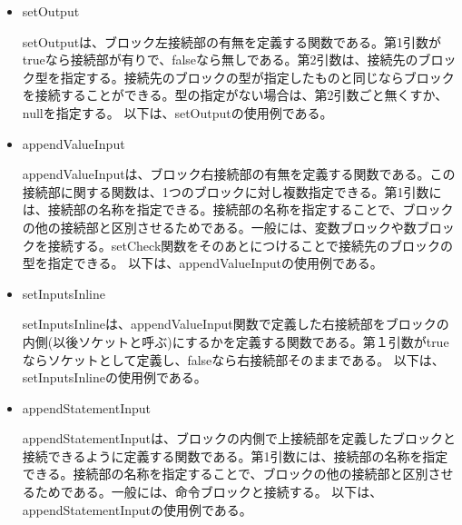 \documentclass{eniepaper}
\begin{document}
\begin{itemize}
\item setOutput

setOutputは、ブロック左接続部の有無を定義する関数である。第1引数がtrueなら接続部が有りで、falseなら無しである。第2引数は、接続先のブロック型を指定する。接続先のブロックの型が指定したものと同じならブロックを接続することができる。型の指定がない場合は、第2引数ごと無くすか、nullを指定する。
以下は、setOutputの使用例である。


\item appendValueInput

appendValueInputは、ブロック右接続部の有無を定義する関数である。この接続部に関する関数は、1つのブロックに対し複数指定できる。第1引数には、接続部の名称を指定できる。接続部の名称を指定することで、ブロックの他の接続部と区別させるためである。一般には、変数ブロックや数ブロックを接続する。setCheck関数をそのあとにつけることで接続先のブロックの型を指定できる。
以下は、appendValueInputの使用例である。


\item setInputsInline

setInputsInlineは、appendValueInput関数で定義した右接続部をブロックの内側(以後ソケットと呼ぶ)にするかを定義する関数である。第１引数がtrueならソケットとして定義し、falseなら右接続部そのままである。
以下は、setInputsInlineの使用例である。


\item appendStatementInput

appendStatementInputは、ブロックの内側で上接続部を定義したブロックと接続できるように定義する関数である。第1引数には、接続部の名称を指定できる。接続部の名称を指定することで、ブロックの他の接続部と区別させるためである。一般には、命令ブロックと接続する。
以下は、appendStatementInputの使用例である。


\end{itemize}
\end{document}
